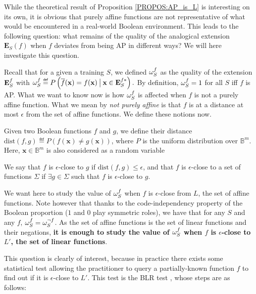 While the theoretical result of Proposition \ref{PROPOS:AP_is_L} is interesting
on its own, it is obvious that purely affine functions are not representative
of what would be encountered in a real-world Boolean environment.  This leads to the
following question: what remains of the quality of the analogical extension
$\mathbf{E}_S(f)$ when $f$ deviates from being AP in different ways? We will
here investigate this question.

Recall that for a given a training $S$, we defined $\omega_{S}^{f}$ as the quality of the
extension $\mathbf{E}_{S}^{f}$ with $\omegasf \eqdef P\left(\albl{\mathbf{x}} = f(\mathbf{x})
\given[\big] \mathbf{x} \in \esfs\right).$ By definition, $\omega_{S}^{f}=1$ for all
$S$ iff $f$ is AP. What we want to know now is how $\omega_{S}^{f}$ is affected when
$f$ is not a purely affine function. What we
mean by \textit{not purely affine} is that $f$ is at a distance at most
$\epsilon$ from the set
of affine functions. We define these notions now.

Given two Boolean functions $f$ and $g$, we define their distance
$\text{dist}(f, g) \eqdef P\left(f(\mathbf{x}) \neq
g(\mathbf{x})\right)$, where $P$ is the uniform distribution over
$\mathbb{B}^m$. Here, $\mathbf{x} \in \mathbb{B}^m$ is also considered as a
random variable

\begin{definition}
We say that $f$ is $\epsilon$-close to $g$ if $\text{dist}(f, g) \leq
  \epsilon$, and that $f$ is $\epsilon$-close to a set of functions $\Sigma$ if
  $\exists g \in \Sigma$ such that $f$ is $\epsilon$-close to $g$.
\end{definition}

We want here to study the value of $\omega_{S}^{f}$ when $f$ is $\epsilon$-close from
$L$, the set of affine functions. Note however that thanks to the
code-independency property of the Boolean proportion ($1$ and $0$ play
symmetric roles), we have that for any $S$ and any $f$, $\omega_{S}^{f} =
\omega_S^{\neg f}$. As the set of affine functions is the set of linear
functions and their negations, \textbf{it is enough to study the value of
$\omega_{S}^{f}$ when $f$ is $\epsilon$-close to $L'$, the set of linear functions}.

This question is clearly of interest, because in practice there exists some
statistical test allowing the practitioner to query a partially-known function
$f$ to find out if it is $\epsilon$-close to $L'$. This test is the BLR test
\cite{BluLubRub93}, whose steps are as follows:

